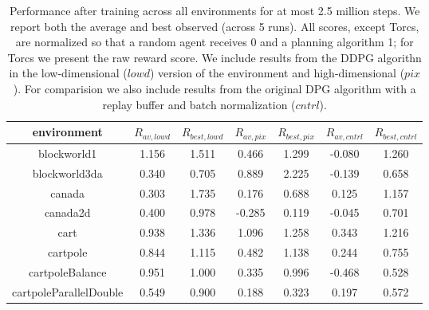 \documentclass{article} %
\begin{document}
\begin{table}[t]
  \caption{ Performance after training across all environments for at most 2.5
    million steps.  We report both the average and best observed
    (across 5 runs). All scores, except Torcs, are normalized so that
    a random agent receives 0 and a planning algorithm 1; for Torcs we
    present the raw reward score. We include results from the DDPG algorithn
    in the low-dimensional
    ($lowd$) version of the environment and high-dimensional ($pix$). For comparision
    we also include results from the original DPG algorithm with a replay
    buffer and batch normalization ($cntrl$).
  } \label{table:results}
\label{eval-table}
\begin{center}
  \begin{tabular}{ c | c | c | c | c | c | c }
    environment & $R_{av,lowd}$ & $R_{best,lowd}$ & $R_{av,pix}$
    & $R_{best,pix}$ & $R_{av,cntrl}$ & $R_{best,cntrl}$\\
    \hline
      blockworld1 & 1.156 & 1.511 & 0.466 & 1.299 &  -0.080 & 1.260 \\
      blockworld3da & 0.340 & 0.705 & 0.889 & 2.225 & -0.139 & 0.658 \\
      canada & 0.303 & 1.735 & 0.176 & 0.688 & 0.125 & 1.157 \\
      canada2d & 0.400 & 0.978 & -0.285 & 0.119 & -0.045 & 0.701 \\
      cart & 0.938 & 1.336 & 1.096 & 1.258 & 0.343 & 1.216 \\
      cartpole & 0.844 & 1.115 & 0.482 & 1.138 & 0.244 & 0.755 \\
      cartpoleBalance & 0.951 & 1.000 & 0.335 & 0.996 & -0.468 & 0.528 \\
      cartpoleParallelDouble & 0.549 & 0.900 & 0.188 & 0.323 & 0.197 & 0.572 \\

\end{tabular}
\end{center}
\end{table}
\end{document}
